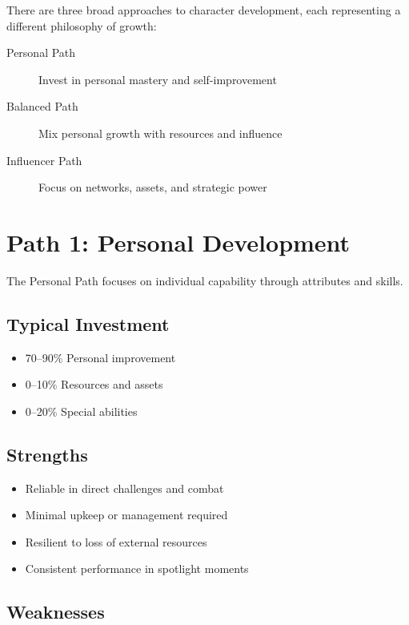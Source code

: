 \documentclass[11pt,twoside,openany]{book}
\begin{document}
There are three broad approaches to character development, each representing a different philosophy of growth:

\begin{description}
\item[Personal Path] Invest in personal mastery and self-improvement
\item[Balanced Path] Mix personal growth with resources and influence
\item[Influencer Path] Focus on networks, assets, and strategic power
\end{description}

\section*{Path 1: Personal Development} 

The Personal Path focuses on individual capability through attributes and skills.

\subsection*{Typical Investment}

\begin{itemize}
\item 70–90\% Personal improvement
\item 0–10\% Resources and assets
\item 0–20\% Special abilities
\end{itemize}

\subsection*{Strengths}

\begin{itemize}
\item Reliable in direct challenges and combat
\item Minimal upkeep or management required
\item Resilient to loss of external resources
\item Consistent performance in spotlight moments
\end{itemize}

\subsection*{Weaknesses}
\end{document}

